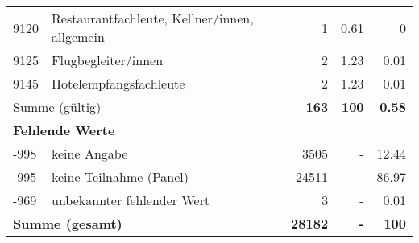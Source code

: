 \begin{longtable}{lXrrr}
        9120 & \multicolumn{1}{X}{Restaurantfachleute, Kellner/innen, allgemein} & %
          \num{1} &
          \num[round-mode=places,round-precision=2]{0,61} &
          \num[round-mode=places,round-precision=2]{0} \\

        9125 & \multicolumn{1}{X}{Flugbegleiter/innen} & %
          \num{2} &
          \num[round-mode=places,round-precision=2]{1,23} &
          \num[round-mode=places,round-precision=2]{0,01} \\

        9145 & \multicolumn{1}{X}{Hotelempfangsfachleute} & %
          \num{2} &
          \num[round-mode=places,round-precision=2]{1,23} &
          \num[round-mode=places,round-precision=2]{0,01} \\

     \midrule
     \multicolumn{2}{l}{Summe (gültig)} &
       \textbf{\num{163}} &
     \textbf{100} &
       \textbf{\num[round-mode=places,round-precision=2]{0,58}} \\
     \multicolumn{5}{l}{\textbf{Fehlende Werte}}\\
       -998 &
       keine Angabe &
         \num{3505} &
        - &
         \num[round-mode=places,round-precision=2]{12,44} \\
       -995 &
       keine Teilnahme (Panel) &
         \num{24511} &
        - &
         \num[round-mode=places,round-precision=2]{86,97} \\
       -969 &
       unbekannter fehlender Wert &
         \num{3} &
        - &
         \num[round-mode=places,round-precision=2]{0,01} \\
     \midrule
     \multicolumn{2}{l}{\textbf{Summe (gesamt)}} &
          \textbf{\num{28182}} &
        \textbf{-} &
        \textbf{100} \\
     \bottomrule
     \end{longtable}
     
